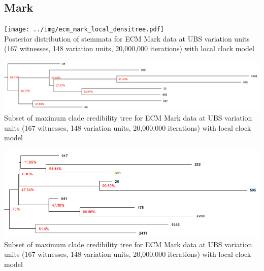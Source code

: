 \documentclass[10pt]{beamer}
\begin{document}
	\subsection{Mark}
	\begin{frame}
		\begin{center}
			\texttt{[image: ../img/ecm\_mark\_local\_densitree.pdf]}\\
			Posterior distribution of stemmata for ECM Mark data at UBS variation units (167 witnesses, 148 variation units, 20,000,000 iterations) with local clock model\\
		\end{center}
	\end{frame}
	\begin{frame}
		\begin{center}
			\includegraphics[width=\textwidth]{../img/ecm_mark_local_max_clade_credibility_tree_a_text.png}\\
			Subset of maximum clade credibility tree for ECM Mark data at UBS variation units (167 witnesses, 148 variation units, 20,000,000 iterations) with local clock model\\
		\end{center}
	\end{frame}
	\begin{frame}
		\begin{center}
			\includegraphics[width=\textwidth]{../img/ecm_mark_local_max_clade_credibility_tree_family_041.png}\\
			Subset of maximum clade credibility tree for ECM Mark data at UBS variation units (167 witnesses, 148 variation units, 20,000,000 iterations) with local clock model\\
		\end{center}
	\end{frame}
\end{document}

